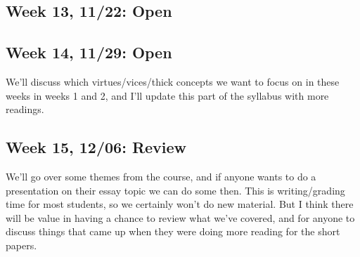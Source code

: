 \documentclass[
]{article}
\begin{document}
\hypertarget{week-13-1122-open}{%
\subsection{Week 13, 11/22: Open}\label{week-13-1122-open}}

\hypertarget{week-14-1129-open}{%
\subsection{Week 14, 11/29: Open}\label{week-14-1129-open}}

We'll discuss which virtues/vices/thick concepts we want to focus on in
these weeks in weeks 1 and 2, and I'll update this part of the syllabus
with more readings.

\hypertarget{week-15-1206-review}{%
\subsection{Week 15, 12/06: Review}\label{week-15-1206-review}}

We'll go over some themes from the course, and if anyone wants to do a
presentation on their essay topic we can do some then. This is
writing/grading time for most students, so we certainly won't do new
material. But I think there will be value in having a chance to review
what we've covered, and for anyone to discuss things that came up when
they were doing more reading for the short papers.
\end{document}
